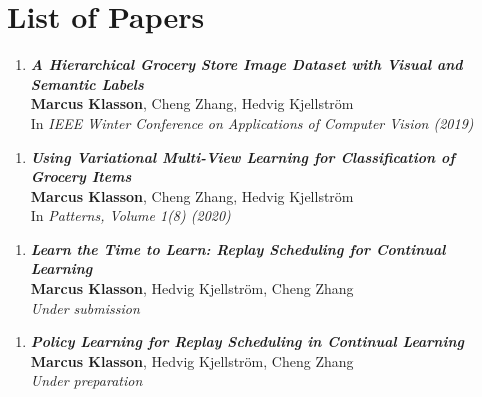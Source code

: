 
\chapter{List of Papers}
\label{chap:list_of_papers}

\begin{enumerate}[\textbf{A}]
	\item \textbf{\textit{A Hierarchical Grocery Store Image Dataset with Visual and Semantic Labels}} \\
	\textbf{Marcus Klasson}, Cheng Zhang, Hedvig Kjellström \\
	In \textit{IEEE Winter Conference on Applications of Computer Vision (2019)}
\end{enumerate}

\begin{enumerate}[\textbf{B}]
	\item \textbf{\textit{Using Variational Multi-View Learning for Classification of Grocery Items}} \\
	\textbf{Marcus Klasson}, Cheng Zhang, Hedvig Kjellström \\
	In \textit{Patterns, Volume 1(8) (2020)}
\end{enumerate}

\begin{enumerate}[\textbf{C}]
	\item \textbf{\textit{Learn the Time to Learn: Replay Scheduling for Continual Learning}} \\
	\textbf{Marcus Klasson}, Hedvig Kjellström, Cheng Zhang \\
	\textit{Under submission}
\end{enumerate}

\begin{enumerate}[\textbf{D}]
	\item \textbf{\textit{Policy Learning for Replay Scheduling in Continual Learning}} \\
	\textbf{Marcus Klasson}, Hedvig Kjellström, Cheng Zhang \\
	\textit{Under preparation}
\end{enumerate}



\begin{comment}
Other contributions by the author not included in the thesis.
\begin{enumerate}[I]
	\setcounter{enumi}{1}
	\item \textbf{\textit{Title of paper}} \\
	\textbf{First author}, Second author \\
	\textit{Journal (year)}
\end{enumerate}
\end{comment}
